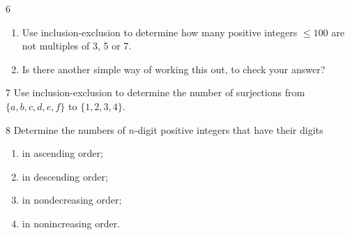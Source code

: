 \begin{exercise}{6}
    \begin{enumerate}[label=(\alph*)]
        \item Use inclusion-exclusion to determine how many positive integers
              $\le100$ are not multiples of 3, 5 or 7.
        \item Is there another simple way of working this out, to check your
              answer?
    \end{enumerate}
\end{exercise}

\begin{exercise}{7}
    Use inclusion-exclusion to determine the number of surjections from
    $\{a,b,c,d,e,f\}$ to $\{1,2,3,4\}$.
\end{exercise}

\begin{exercise}{8}
    Determine the numbers of $n$-digit positive integers that have their digits
    \begin{enumerate}[label=(\alph*)]
        \item in ascending order;
        \item in descending order;
        \item in nondecreasing order;
        \item in nonincreasing order.
    \end{enumerate}
\end{exercise}

